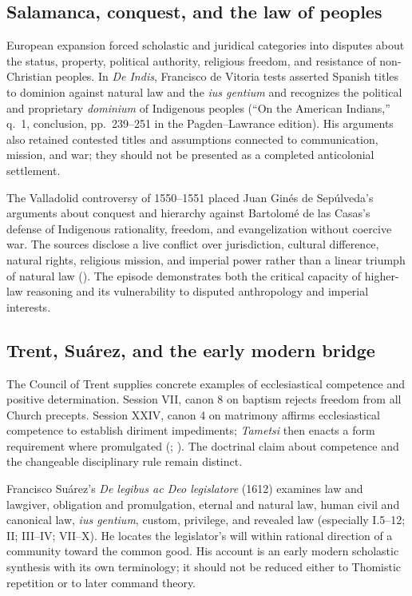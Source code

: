 \subsection{Salamanca, conquest, and the law of peoples}

European expansion forced scholastic and juridical categories into disputes about the status, property, political authority, religious freedom, and resistance of non-Christian peoples. In \emph{De Indis}, Francisco de Vitoria tests asserted Spanish titles to dominion against natural law and the \emph{ius gentium} and recognizes the political and proprietary \emph{dominium} of Indigenous peoples (``On the American Indians,'' q.~1, conclusion, pp.~239--251 in the Pagden--Lawrance edition). His arguments also retained contested titles and assumptions connected to communication, mission, and war; they should not be presented as a completed anticolonial settlement.

The Valladolid controversy of 1550--1551 placed Juan Ginés de Sepúlveda's arguments about conquest and hierarchy against Bartolomé de las Casas's defense of Indigenous rationality, freedom, and evangelization without coercive war. The sources disclose a live conflict over jurisdiction, cultural difference, natural rights, religious mission, and imperial power rather than a linear triumph of natural law (). The episode demonstrates both the critical capacity of higher-law reasoning and its vulnerability to disputed anthropology and imperial interests.

\subsection{Trent, Suárez, and the early modern bridge}

The Council of Trent supplies concrete examples of ecclesiastical competence and positive determination. Session VII, canon 8 on baptism rejects freedom from all Church precepts. Session XXIV, canon 4 on matrimony affirms ecclesiastical competence to establish diriment impediments; \emph{Tametsi} then enacts a form requirement where promulgated (; ). The doctrinal claim about competence and the changeable disciplinary rule remain distinct.

Francisco Suárez's \emph{De legibus ac Deo legislatore} (1612) examines law and lawgiver, obligation and promulgation, eternal and natural law, human civil and canonical law, \emph{ius gentium}, custom, privilege, and revealed law (especially I.5--12; II; III--IV; VII--X). He locates the legislator's will within rational direction of a community toward the common good. His account is an early modern scholastic synthesis with its own terminology; it should not be reduced either to Thomistic repetition or to later command theory.

